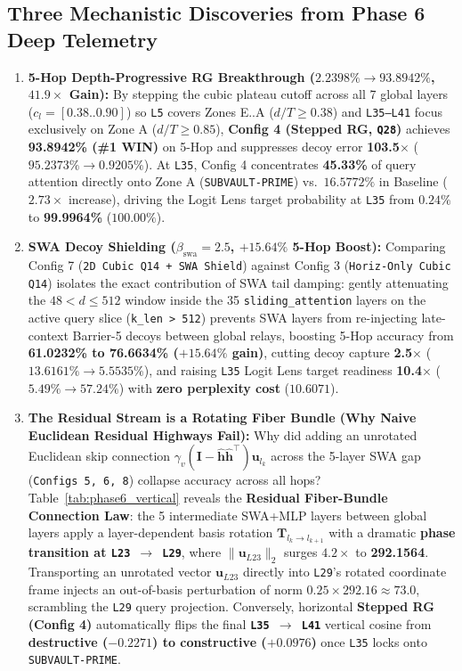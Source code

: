 \documentclass[11pt,letterpaper]{article}
\begin{document}
\subsection{Three Mechanistic Discoveries from Phase 6 Deep Telemetry}

\begin{enumerate}
    \item \textbf{5-Hop Depth-Progressive RG Breakthrough ($2.2398\% \to 93.8942\%$, $41.9\times$ Gain):}
    By stepping the cubic plateau cutoff across all 7 global layers ($c_l = [0.38..0.90]$) so \texttt{L5} covers Zones E..A ($d/T \ge 0.38$) and \texttt{L35--L41} focus exclusively on Zone A ($d/T \ge 0.85$), \textbf{Config 4 (Stepped RG, \texttt{Q28})} achieves \textbf{93.8942\% (\#1 WIN)} on 5-Hop and suppresses decoy error \textbf{103.5$\times$} ($95.2373\% \to 0.9205\%$). At \texttt{L35}, Config 4 concentrates \textbf{45.33\%} of query attention directly onto Zone A (\texttt{SUBVAULT-PRIME}) vs.\ $16.5772\%$ in Baseline ($2.73\times$ increase), driving the Logit Lens target probability at \texttt{L35} from $0.24\%$ to \textbf{99.9964\%} ($100.00\%$).
    \item \textbf{SWA Decoy Shielding ($\beta_{\text{swa}} = 2.5$, $+15.64\%$ 5-Hop Boost):}
    Comparing Config 7 (\texttt{2D Cubic Q14 + SWA Shield}) against Config 3 (\texttt{Horiz-Only Cubic Q14}) isolates the exact contribution of SWA tail damping: gently attenuating the $48 < d \le 512$ window inside the 35 \texttt{sliding\_attention} layers on the active query slice (\texttt{k\_len > 512}) prevents SWA layers from re-injecting late-context Barrier-5 decoys between global relays, boosting 5-Hop accuracy from \textbf{61.0232\% to 76.6634\% ($+15.64\%$ gain)}, cutting decoy capture \textbf{2.5$\times$} ($13.6161\% \to 5.5535\%$), and raising \texttt{L35} Logit Lens target readiness \textbf{10.4$\times$} ($5.49\% \to 57.24\%$) with \textbf{zero perplexity cost} ($10.6071$).
    \item \textbf{The Residual Stream is a Rotating Fiber Bundle (Why Naive Euclidean Residual Highways Fail):}
    Why did adding an unrotated Euclidean skip connection $\gamma_v (\mathbf{I} - \hat{\mathbf{h}}\hat{\mathbf{h}}^\top)\mathbf{u}_{l_k}$ across the 5-layer SWA gap (\texttt{Configs 5, 6, 8}) collapse accuracy across all hops? Table~\ref{tab:phase6_vertical} reveals the \textbf{Residual Fiber-Bundle Connection Law}: the 5 intermediate SWA+MLP layers between global layers apply a layer-dependent basis rotation $\mathbf{T}_{l_k \to l_{k+1}}$ with a dramatic \textbf{phase transition at \texttt{L23 $\to$ L29}}, where $\|\mathbf{u}_{L23}\|_2$ surges $4.2\times$ to \textbf{292.1564}. Transporting an unrotated vector $\mathbf{u}_{L23}$ directly into \texttt{L29}'s rotated coordinate frame injects an out-of-basis perturbation of norm $0.25 \times 292.16 \approx 73.0$, scrambling the \texttt{L29} query projection. Conversely, horizontal \textbf{Stepped RG (Config 4)} automatically flips the final \textbf{\texttt{L35 $\to$ L41}} vertical cosine from \textbf{destructive ($-0.2271$) to constructive ($+0.0976$)} once \texttt{L35} locks onto \texttt{SUBVAULT-PRIME}.
\end{enumerate}
\end{document}
